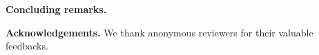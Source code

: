 \documentclass{sig-alternate}
\begin{document}
\textbf{Concluding remarks.}
\label{sec:conclusion}


\textbf{Acknowledgements.} We thank anonymous reviewers for their valuable feedbacks.
%
\scriptsize
\vspace*{-1.3345054410983925mm}

%
%

\end{document}
